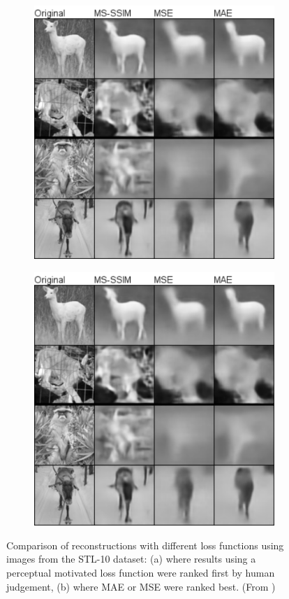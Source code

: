 \begin{figure}[htpb]
\centering
\begin{subfigure}{0.4\textwidth}
  \centering
  \includegraphics[width=.8\linewidth]{figures/img-loss-comp1.png}
  \caption{}
  \label{fig:percept-vs-lp1}
\end{subfigure}%
\begin{subfigure}{0.4\textwidth}
  \centering
  \includegraphics[width=.8\linewidth]{figures/img-loss-comp1.png}
  \caption{}
  \label{fig:percept-vs-lp2}
\end{subfigure}
\caption[Comparison of Reconstructions with Different Loss Functions]{Comparison of reconstructions with different loss functions using images from the STL-10 dataset: (a) where results using a perceptual motivated loss function were ranked first by human judgement, (b) where MAE or MSE were ranked best. (From \parencite{learning-perc-sim})}
\label{fig:percept-vs-lp}
\end{figure}


